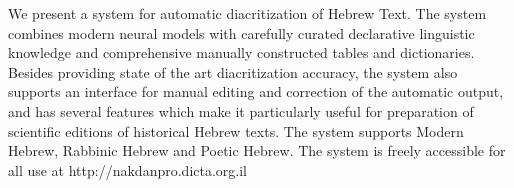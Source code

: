 We present a system for automatic diacritization of Hebrew Text. The system combines modern neural models with carefully curated declarative linguistic knowledge and comprehensive manually constructed tables and dictionaries. Besides providing state of the art diacritization accuracy, the system also supports an interface for manual editing and correction of the automatic output, and has several features which make it particularly useful for preparation of scientific editions of historical Hebrew texts. The system supports Modern Hebrew, Rabbinic Hebrew and Poetic Hebrew. The system is freely accessible for all use at http://nakdanpro.dicta.org.il

